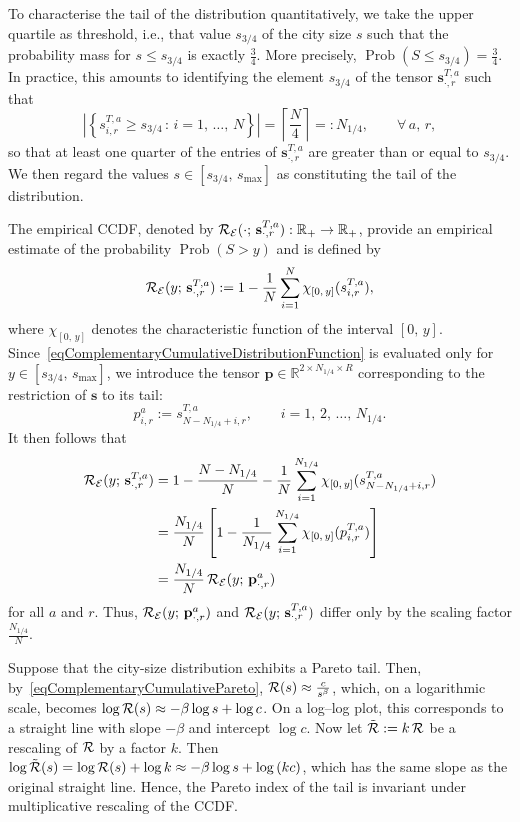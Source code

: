 \documentclass[a4paper]{article}
\newcommand{\R}{\mathbb{R}}
\begin{document}
To characterise the tail of the distribution quantitatively, we take the upper quartile as threshold, i.e., that value $s_{3/4}$ of the city size $s$ such that the probability mass for $s\leq s_{3/4}$ is exactly $\frac{3}{4}$. More precisely, $\operatorname{Prob}(S\leq s_{3/4})=\frac{3}{4}$. In practice, this amounts to identifying the element $s_{3/4}$ of the tensor $\mathbf s^{T,a}_{\cdot,r}$ such that
$$ \left\vert\left\{s^{T,a}_{i,r}\geq s_{3/4}\,:\, i=1,\,\dots,\,N\right\}\right\vert=\left\lceil\frac{N}{4}\right\rceil=:N_{1/4},
    \qquad \forall\,a,\,r, $$
so that at least one quarter of the entries of $\mathbf s^{T,a}_{\cdot,r}$ are greater than or equal to $s_{3/4}$. We then regard the values $s\in [s_{3/4},\,s_{\max}]$ as constituting the tail of the distribution.

The empirical CCDF, denoted by $\CCDF_{\mathcal E}(\cdot;\,\mathbf s^{T,a}_{\cdot,r}):\R_+\to\R_+$, provide an empirical estimate of the probability $\operatorname{Prob}(S>y)$ and is defined by
\begin{equation}
    \CCDF_{\mathcal E}(y;\,\mathbf s^{T,a}_{\cdot,r}):=1-\frac{1}{N}\sum_{i=1}^N\chi_{[0,\,y]}(s^{T,a}_{i,r}),
    \label{eqComplementaryCumulativeDistributionFunction}
\end{equation}
where $\chi_{[0,\,y]}$ denotes the characteristic function of the interval $[0,\,y]$. Since~\eqref{eqComplementaryCumulativeDistributionFunction} is evaluated only for $y\in [s_{3/4},\,s_{\max}]$, we introduce the tensor $\mathbf p\in\mathbb R^{2\times N_{1/4}\times R}$ corresponding to the restriction of \(\mathbf s\) to its tail:
$$ p^a_{i,r}:=s^{T,a}_{N-N_{1/4}+i,r}, \qquad i=1,\,2,\,\dots,\,N_{1/4}. $$
It then follows that
\begin{align*}
    \operatorname{\mathcal R}_{\mathcal E}(y;\,\mathbf s^{T,a}_{\cdot,r}) &= 1-\frac{N-N_{1/4}}{N}-\frac{1}{N}\sum_{i=1}^{N_{1/4}}\chi_{[0,\,y]}(s^{T,a}_{N-N_{1/4}+i,r}) \\
    &= \frac{N_{1/4}}{N}\left[1-\frac{1}{N_{1/4}}\sum_{i=1}^{N_{1/4}}\chi_{[0,\,y]}(p^{T,a}_{i,r})\right] \\
    &= \frac{N_{1/4}}{N}\operatorname{\mathcal R}_{\mathcal E}(y;\,\mathbf p^a_{\cdot,r})
\end{align*}
for all $a$ and $r$. Thus, $\operatorname{\mathcal R}_{\mathcal E}(y;\,\mathbf p^a_{\cdot,r})$ and $\operatorname{\mathcal R}_{\mathcal E}(y;\,\mathbf s^{T,a}_{\cdot,r})$ differ only by the scaling factor $\frac{N_{1/4}}{N}$.
                
\begin{rmk}
Suppose that the city-size distribution exhibits a Pareto tail. Then, by~\eqref{eqComplementaryCumulativePareto}, $\operatorname{\mathcal R}(s)\approx\frac{c}{s^\beta}$, which, on a logarithmic scale, becomes $\log{\operatorname{\mathcal R}(s)}\approx-\beta\log{s}+\log{c}$. On a log--log plot, this corresponds to a straight line with slope $-\beta$ and intercept $\log{c}$. Now let $\tilde{\operatorname{\mathcal R}}:=k\operatorname{\mathcal R}$ be a rescaling of $\operatorname{\mathcal R}$ by a factor $k$. Then $\log{\tilde{\operatorname{\mathcal R}}(s)}=\log{\operatorname{\mathcal R}(s)}+\log{k}\approx-\beta\log{s}+\log{(kc)}$, which has the same slope as the original straight line. Hence, the Pareto index of the tail is invariant under multiplicative rescaling of the CCDF.
\label{ossLogarithmParetoCCDF}
\end{rmk}
\end{document}
